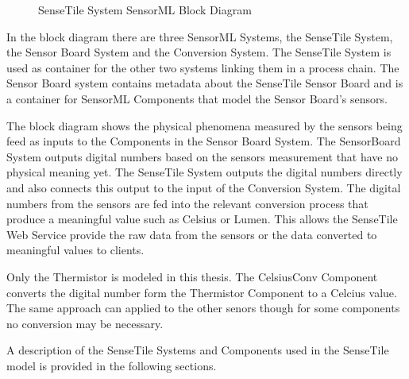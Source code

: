 \documentclass[]{final_report}
\begin{document}
\begin{figure}[h]
\centering
{}
\caption{SenseTile System SensorML Block Diagram}\label{fig:SensorML_SenseTile_System_comp}
\end{figure}

In the block diagram there are three SensorML Systems, the SenseTile System, the Sensor Board System and the Conversion System. The SenseTile System is used as container for the other two systems linking them in a process chain. The Sensor Board system contains metadata about the SenseTile Sensor Board and is a container for SensorML Components that model the Sensor Board's sensors.

The block diagram shows the physical phenomena measured by the sensors being feed as inputs to the Components in the Sensor Board System. The SensorBoard System outputs digital numbers based on the sensors measurement that have no physical meaning yet. The SenseTile System outputs the digital numbers directly and also connects this output to the input of the Conversion System. The digital numbers from the sensors are fed into the relevant conversion process that produce a meaningful value such as Celsius or Lumen. This allows the SenseTile Web Service provide the raw data from the sensors or the data converted to meaningful values to clients.

Only the Thermistor is modeled in this thesis. The  CelsiusConv Component converts the digital number form the Thermistor Component to a Celcius value. The same approach can applied to the other senors though for some components no conversion may be necessary.

A description of the SenseTile Systems and Components used in the SenseTile model is provided in the following sections.
\end{document}

